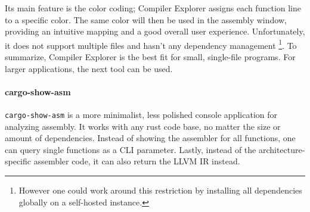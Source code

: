 Its main feature is the color coding; Compiler Explorer assigns each function line to a specific color. The same color will then be used in the assembly window, providing an intuitive mapping and a good overall user experience. Unfortunately, it does not support multiple files and hasn't any dependency management \footnote{However one could work around this restriction by installing all dependencies globally on a self-hosted instance.}. To summarize, Compiler Explorer is the best fit for small, single-file programs. For larger applications, the next tool can be used.

\paragraph{cargo-show-asm}

\texttt{cargo-show-asm} \cite{cargoshowasm} is a more minimalist, less polished console application for analyzing assembly. It works with any rust code base, no matter the size or amount of dependencies. Instead of showing the assembler for all functions, one can query single functions as a CLI parameter. Lastly, instead of the architecture-specific assembler code, it can also return the \ac{LLVM} \ac{IR} instead.

